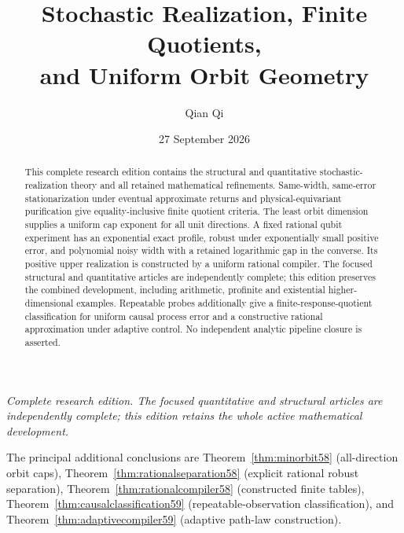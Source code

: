\documentclass[11pt]{amsart}
\title[Stochastic realization and orbit geometry]{Stochastic Realization, Finite Quotients,\\and Uniform Orbit Geometry}
\author{Qian Qi}
\date{27 September 2026}
\numberwithin{equation}{section}
\theoremstyle{definition}\newtheorem{definition}[theorem]{Definition}
\theoremstyle{remark}\newtheorem{remark}[theorem]{Remark}
\begin{document}
\begin{abstract}
This complete research edition contains the structural and quantitative
stochastic-realization theory and all retained mathematical refinements.
Same-width, same-error stationarization under eventual approximate returns
and physical-equivariant purification give equality-inclusive finite
quotient criteria. The least orbit dimension supplies a uniform cap
exponent for all unit directions. A fixed rational qubit experiment has
an exponential exact profile, robust under exponentially small positive
error, and polynomial noisy width with a retained logarithmic gap in the
converse. Its positive upper realization is constructed by a uniform
rational compiler. The focused structural and quantitative articles are
independently complete; this edition preserves the combined development,
including arithmetic, profinite and existential higher-dimensional
examples. Repeatable probes additionally give a finite-response-quotient
classification for uniform causal process error and a constructive
rational approximation under adaptive control. No independent analytic
pipeline closure is asserted.
\end{abstract}
\maketitle
\noindent\textit{Complete research edition. The focused quantitative and structural articles are independently complete; this edition retains the whole active mathematical development.}

\noindent The principal additional conclusions are
Theorem~\ref{thm:minorbit58} (all-direction orbit caps),
Theorem~\ref{thm:rationalseparation58} (explicit rational robust separation),
Theorem~\ref{thm:rationalcompiler58} (constructed finite tables),
Theorem~\ref{thm:causalclassification59} (repeatable-observation
classification), and Theorem~\ref{thm:adaptivecompiler59} (adaptive
path-law construction).
























\appendix


\end{document}
